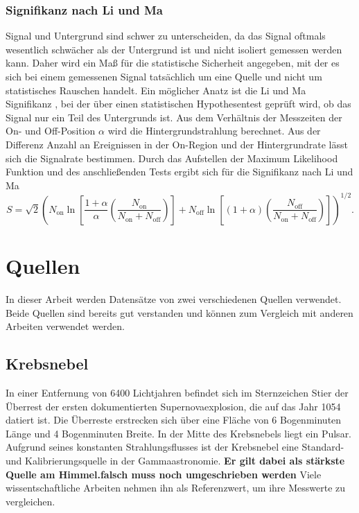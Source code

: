 \subsection*{Signifikanz nach Li und Ma}
Signal und Untergrund sind schwer zu unterscheiden, da das Signal oftmals wesentlich schwächer als der Untergrund ist und nicht isoliert gemessen werden kann. 
Daher wird ein Maß für die statistische Sicherheit angegeben, mit der es sich bei einem gemessenen Signal tatsächlich um eine Quelle und nicht um statistisches Rauschen handelt.
Ein möglicher Anatz ist die Li und Ma Signifikanz \cite{liandma}, bei der über einen statistischen Hypothesentest geprüft wird, ob das Signal nur ein Teil des Untergrunds ist. 
Aus dem Verhältnis der Messzeiten der On- und Off-Position $\alpha$ wird die Hintergrundstrahlung berechnet. 
Aus der Differenz Anzahl an Ereignissen in der On-Region und der Hintergrundrate lässt sich die Signalrate bestimmen. 
Durch das Aufstellen der Maximum Likelihood Funktion und des anschließenden Tests ergibt sich für die Signifikanz nach Li und Ma
\begin{equation}
S = \sqrt{2} \left( N_\text{on} \ln \left[ \frac{1+ \alpha}{\alpha}\left( \frac{N_\text{on}}{N_\text{on} + N_\text{off}} \right) \right] + N_\text{off} \ln \left[ \left( 1+ \alpha \right) \left( \frac{N_\text{off}}{N_\text{on} + N_\text{off}} \right) \right] \right)^{1/2}.
\end{equation}

\chapter{Quellen}
In dieser Arbeit werden Datensätze von zwei verschiedenen Quellen verwendet. 
Beide Quellen sind bereits gut verstanden und können zum Vergleich mit anderen Arbeiten verwendet werden.
\section{Krebsnebel}
In einer Entfernung von 6400 Lichtjahren befindet sich im Sternzeichen Stier der Überrest der ersten dokumentierten Supernovaexplosion, die auf das Jahr 1054 datiert ist. 
Die Überreste erstrecken sich über eine Fläche von 6 Bogenminuten Länge und 4 Bogenminuten Breite. 
In der Mitte des Krebsnebels liegt ein Pulsar.
Aufgrund seines konstanten Strahlungsflusses ist der Krebsnebel eine Standard- und Kalibrierungsquelle in der Gammaastronomie.
\textbf{Er gilt dabei als stärkste Quelle am Himmel.falsch muss noch umgeschrieben werden} 
Viele wissentschaftliche Arbeiten nehmen ihn als Referenzwert, um ihre Messwerte zu vergleichen. 

